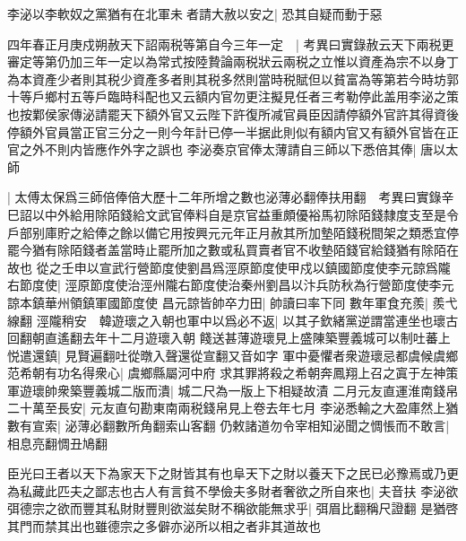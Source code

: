 李泌以李軟奴之黨猶有在北軍未者請大赦以安之|{
	恐其自疑而動于惡}


四年春正月庚戍朔赦天下詔兩税等第自今三年一定　|{
	考異曰實錄赦云天下兩税更審定等第仍加三年一定以為常式按陸贄論兩税狀云兩税之立惟以資產為宗不以身丁為本資產少者則其税少資產多者則其税多然則當時税賦但以貧富為等第若今時坊郭十等戶鄉村五等戶臨時科配也又云額内官勿更注擬見任者三考勒停此盖用李泌之策也按鄴侯家傳泌請罷天下額外官又云陛下許復所减官員臣因請停額外官許其得資後停額外官員當正官三分之一則今年計已停一半据此則似有額内官又有額外官皆在正官之外不則内皆應作外字之誤也}
李泌奏京官俸太薄請自三師以下悉倍其俸|{
	唐以太師}


|{
	太傅太保爲三師倍俸倍大歷十二年所增之數也泌薄必翻俸扶用翻　考異曰實錄辛巳詔以中外給用除陌錢給文武官俸料自是京官益重頗優裕馬初除陌錢隸度支至是令戶部别庫貯之給俸之餘以備它用按興元元年正月赦其所加墊陌錢税間架之類悉宜停罷今猶有除陌錢者盖當時止罷所加之數或私買賣者官不收墊陌錢官給錢猶有除陌在故也}
從之壬申以宣武行營節度使劉昌爲涇原節度使甲戍以鎮國節度使李元諒爲隴右節度使|{
	涇原節度使治涇州隴右節度使治秦州劉昌以汴兵防秋為行營節度使李元諒本鎮華州領鎮軍國節度使}
昌元諒皆帥卒力田|{
	帥讀曰率下同}
數年軍食充羨|{
	羨弋線翻}
涇隴稍安　韓遊瓌之入朝也軍中以爲必不返|{
	以其子欽緒黨逆謂當連坐也瓌古回翻朝直遙翻去年十二月遊瓌入朝}
餞送甚薄遊瓌見上盛陳築豐義城可以制吐蕃上悦遣還鎮|{
	見賢遍翻吐從暾入聲還從宣翻又音如字}
軍中憂懼者衆遊瓌忌都虞候虞鄉范希朝有功名得衆心|{
	虞鄉縣屬河中府}
求其罪將殺之希朝奔鳳翔上召之寘于左神策軍遊瓌帥衆築豐義城二版而潰|{
	城二尺為一版上下相疑故漬}
二月元友直運淮南錢帛二十萬至長安|{
	元友直句勘東南兩税錢帛見上卷去年七月}
李泌悉輸之大盈庫然上猶數有宣索|{
	泌薄必翻數所角翻索山客翻}
仍敕諸道勿令宰相知泌聞之惆悵而不敢言|{
	相息亮翻惆丑鳩翻}


臣光曰王者以天下為家天下之財皆其有也阜天下之財以養天下之民已必豫焉或乃更為私藏此匹夫之鄙志也古人有言貧不學儉夫多財者奢欲之所自來也|{
	夫音扶}
李泌欲弭德宗之欲而豐其私財財豐則欲滋矣財不稱欲能無求乎|{
	弭眉比翻稱尺證翻}
是猶啓其門而禁其出也雖德宗之多僻亦泌所以相之者非其道故也

